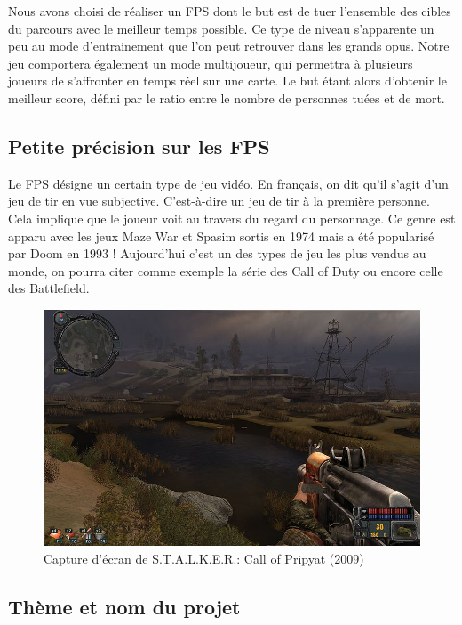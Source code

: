 \documentclass[a4paper, 11pt]{report}
\begin{document}
Nous avons choisi de réaliser un FPS dont le but est de tuer l'ensemble des cibles du parcours avec le meilleur temps possible. Ce type de niveau s'apparente un peu au mode d'entrainement que l'on peut retrouver dans les grands opus. Notre jeu comportera également un mode multijoueur, qui permettra à plusieurs joueurs de s'affronter en temps réel sur une carte. Le but étant alors d'obtenir le meilleur score, défini par le ratio entre le nombre de personnes tuées et de mort.

\subsection{Petite précision sur les FPS}\label{petite-pruxe9cision-sur-les-fps}

Le FPS désigne un certain type de jeu vidéo. En français, on dit qu'il s'agit d'un jeu de tir en vue subjective. C'est-à-dire un jeu de tir à la première personne. Cela implique que le joueur voit au travers du regard du personnage. Ce genre est apparu avec les jeux Maze War et Spasim sortis en 1974 mais a été popularisé par Doom en 1993 ! Aujourd'hui c'est un des types de jeu les plus vendus au monde, on pourra citer comme exemple la série des Call of Duty ou encore celle des Battlefield.

\begin{figure}[htbp]
\centering
\includegraphics[scale=0.4]{exemple_FPS.jpg}
\caption{Capture d'écran de S.T.A.L.K.E.R.: Call of Pripyat (2009)}
\end{figure}

\subsection{Thème et nom du projet}\label{thuxe8mes-et-noms-du-projet}
\end{document}
